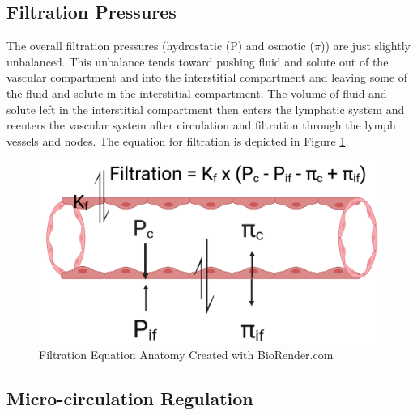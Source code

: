 \subsection{Filtration Pressures}

The overall filtration pressures (hydrostatic (P) and osmotic ($\pi$)) are just slightly unbalanced. This unbalance tends toward pushing fluid and solute out of the vascular compartment and into the interstitial compartment and leaving some of the fluid and solute in the interstitial compartment. The volume of fluid and solute left in the interstitial compartment then enters the lymphatic system and reenters the vascular system after circulation and filtration through the lymph vessels and nodes. 
The equation for filtration is depicted in Figure \ref{fig:filtration_equation}. 

\begin{figure}[!h]
    \centering
    \includegraphics[width=1\linewidth]{./figure/filtration_equation.png}
    \caption{Filtration Equation Anatomy \footnotesize{Created with BioRender.com}}
    \label{fig:filtration_equation}
\end{figure}

\subsection{Micro-circulation Regulation}

